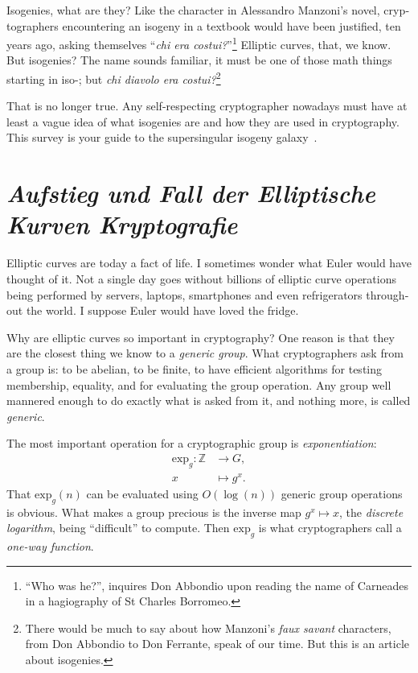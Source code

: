 \begin{otherlanguage}{english}
  \def\Z{\mathbb{Z}}
  \def\Q{\mathbb{Q}}
  \def\F{\mathbb{F}}
  \def\exp{\mathrm{exp}}
  \def\com{\mathcal{C}}
  \def\Gal{\mathrm{Gal}}
  \def\End{\mathrm{End}}
  \def\Ell{\mathrm{Ell}}
  \def\Cl{\mathrm{Cl}}
  \def\O{\mathcal{O}}
  
  Isogenies, what are they? Like the character in Alessandro Manzoni's
  novel, cryptographers encountering an isogeny in a textbook would
  have been justified, ten years ago, asking themselves ``\textit{chi
    era costui?}''\footnote{``Who was he?'', inquires Don Abbondio
    upon reading the name of Carneades in a hagiography of St Charles
    Borromeo.} Elliptic curves, that, we know. But isogenies?  The
  name sounds familiar, it must be one of those math things starting
  in iso-; but \textit{chi diavolo era costui?}\footnote{There would
    be much to say about how Manzoni's \textit{faux savant}
    characters, from Don Abbondio to Don Ferrante, speak of our
    time. But this is an article about isogenies.}

  That is no longer true. Any self-respecting cryptographer nowadays
  must have at least a vague idea of what isogenies are and how they
  are used in cryptography. This survey is your guide to the
  supersingular isogeny galaxy~\cite{galaxy}.

  \section{\textit{Aufstieg und Fall der Elliptische Kurven Kryptografie}}
  Elliptic curves are today a fact of life.  I sometimes wonder what
  Euler would have thought of it.  Not a single day goes without
  billions of elliptic curve operations being performed by servers,
  laptops, smartphones and even refrigerators throughout the world. I
  suppose Euler would have loved the fridge.

  Why are elliptic curves so important in cryptography? One reason is
  that they are the closest thing we know to a \emph{generic
    group}. What cryptographers ask from a group is: to be abelian, to
  be finite, to have efficient algorithms for testing membership,
  equality, and for evaluating the group operation. Any group well
  mannered enough to do exactly what is asked from it, and nothing
  more, is called \emph{generic}.

  The most important operation for a cryptographic group is
  \emph{exponentiation}:
  \begin{align*}
    \exp_g : \Z &\to G,\\
    x &\mapsto g^x.
  \end{align*}
  That $\exp_g(n)$ can be evaluated using $O(\log(n))$ generic group
  operations is obvious. What makes a group precious is the inverse
  map $g^x\mapsto x$, the \emph{discrete logarithm}, being
  ``difficult'' to compute. Then $\exp_g$ is what cryptographers call
  a \emph{one-way function}.


\end{otherlanguage}

